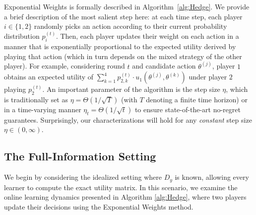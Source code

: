 Exponential Weights is formally described in Algorithm~\ref{alg:Hedge}.
We provide a brief description of the most salient step here: at each time step, each player $i \in \{1,2\}$ randomly picks an action according to their current probability distribution $p_i^{(t)}$. Then, each player updates their weight on each action in a manner that is exponentially proportional to the expected utility derived by playing that action (which in turn depends on the mixed strategy of the other player). For example, considering round $t$ and candidate action $\theta^{(j)}$, player $1$ obtains an expected utility of $\sum_{k=1}^4 p^{(t)}_{2,k} \cdot u_1\left(\theta^{(j)},\theta^{(k)}\right)$ under player $2$ playing $p_2^{(t)}$. An important parameter of the algorithm is the step size $\eta$, which is traditionally set as $\eta = \Theta(1/\sqrt{T})$ (with $T$ denoting a finite time horizon) or in a time-varying manner $\eta_t = \Theta(1/\sqrt{t})$ to ensure state-of-the-art no-regret guarantees.
Surprisingly, our characterizations will hold for any \emph{constant} step size $\eta \in (0, \infty)$.

\subsection{The Full-Information Setting}
\label{sec:det-hedge-convergence}

We begin by considering the idealized setting where \( D_y \) is known, allowing every learner to compute the exact utility matrix. In this scenario, we examine the online learning dynamics presented in Algorithm \ref{alg:Hedge}, where two players update their decisions using the Exponential Weights method. 


